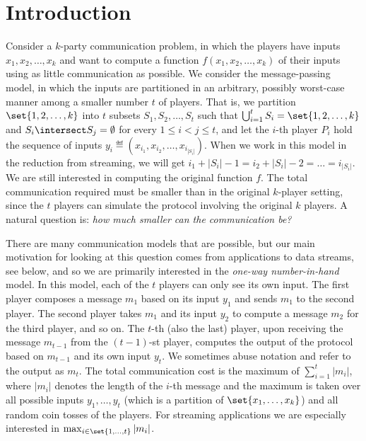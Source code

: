 
%
%
%


\section{Introduction}
\label{sec:intro}

Consider a $k$-party communication problem, in which the players have inputs $x_1, x_2, \ldots, x_k$ %
 and want to compute a function $f(x_1, x_2, \ldots, x_k)$ of their inputs using as little communication as possible. 
We consider the message-passing model, in which the inputs are partitioned in an arbitrary, possibly worst-case manner among a smaller number $t$ of players. 
That is, we partition $\set{1,2,\dots,k}$ into $t$ subsets $S_1, S_2, \ldots, S_t$ such that %
$\bigcup_{i=1}^t S_i = \set{1,2,\dots,k}$ %
and $S_i\intersect S_j = \emptyset$ for every $1\le i< j\le t$,
and let the $i$-th player $P_i$ hold the sequence of inputs $y_i\eqdef \left(x_{i_1}, x_{i_2}, \ldots, x_{i_{|S_i|}}\right)$. When we work in this model in the reduction from streaming, we will get $i_1 + |S_i|-1 = i_2+|S_i|-2 = \dots = i_{|S_i|}$.
We are still interested in computing the original function $f$.
The total communication required must be smaller than in the original $k$-player setting, since the $t$ players can simulate the protocol involving the original $k$ players. 
A natural question is: \emph{how much smaller can the communication be?}

There are many communication models that are possible, but our main motivation for looking at this question comes from applications to data streams, see below, and so we are primarily interested in the \emph{one-way number-in-hand} model. In this model, each of the $t$ players can only see its own input. 
The first player composes a message $m_1$ based on its input $y_1$ and sends $m_1$ to the second player. 
The second player takes $m_1$ and its input $y_2$ to compute a message $m_2$ for the third player, and so on. 
The $t$-th (also the last) player, upon receiving the message $m_{t-1}$ from the $(t-1)$-st player, computes the output of the protocol based on $m_{t-1}$ and its own input $y_t$. We sometimes abuse notation and refer to the output as $m_t$. 
The total communication cost is the maximum of $\sum_{i=1}^{t} |m_i|$, where $|m_i|$ denotes the length of the $i$-th message and the maximum is taken over all possible inputs $y_1,\ldots, y_t$ (which is a partition of $\set{x_1, \ldots, x_k}$) and all random coin tosses of the players. 
For streaming applications we are especially interested in $\max_{i\in\set{1, \ldots, t}} |m_i|$. 

